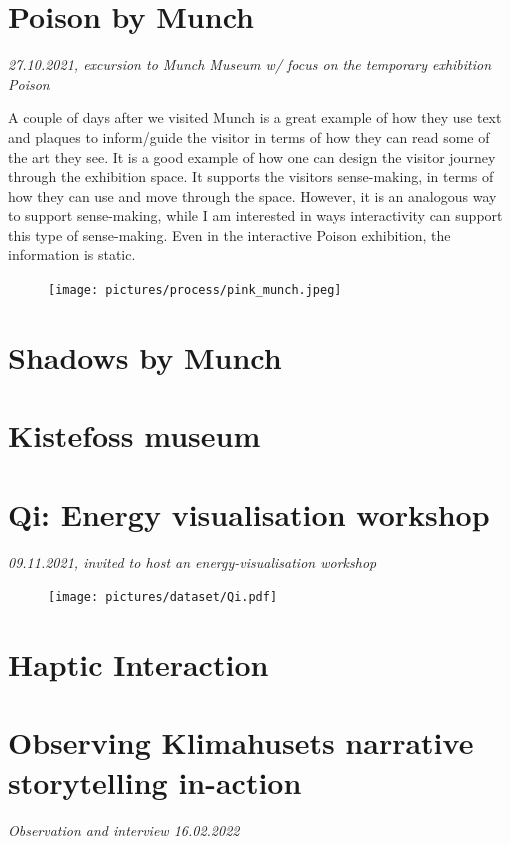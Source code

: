 \section{Poison by Munch}
\par
\emph{27.10.2021, excursion to Munch Museum w/ focus on the temporary exhibition Poison}
\par

A couple of days after we visited 
Munch is a great example of how they use text and plaques to inform/guide the visitor in terms of how they can read some of the art they see. It is a good example of how one can design the visitor journey through the exhibition space. It supports the visitors sense-making, in terms of how they can use and move through the space. However, it is an analogous way to support sense-making, while I am interested in ways interactivity can support this type of sense-making. Even in the interactive Poison exhibition, the information is static.

\begin{figure}[H]
\texttt{[image: pictures/process/pink\_munch.jpeg]}
\centering 
\end{figure}

\section{Shadows by Munch}

\section{Kistefoss museum}

\section{Qi: Energy visualisation workshop}
\emph{09.11.2021, invited to host an energy-visualisation workshop}
\begin{figure}[H]
\texttt{[image: pictures/dataset/Qi.pdf]}
\centering 
\end{figure}

\section{Haptic Interaction}

\section{Observing Klimahusets narrative storytelling in-action}
\par
\emph{Observation and interview 16.02.2022}
\par


